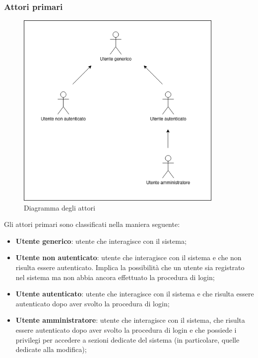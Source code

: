 \subsubsection{Attori primari}
	\begin{figure}[h!]
		\centering
		\includegraphics[width=10cm]{images/diagramma_attori.png}
		\caption{Diagramma degli attori}
	\end{figure}
	
	Gli attori primari sono classificati nella maniera seguente:
	\begin{itemize}
		\item \textbf{Utente generico}: utente che interagisce con il sistema;
		\item \textbf{Utente non autenticato}: utente che interagisce con il sistema e che non risulta essere autenticato. Implica la possibilità che un utente sia registrato nel sistema ma non abbia ancora effettuato la procedura di login;
		\item \textbf{Utente autenticato}: utente che interagisce con il sistema e che risulta essere autenticato dopo aver svolto la procedura di login;
		\item \textbf{Utente amministratore}: utente che interagisce con il sistema, che risulta essere autenticato dopo aver svolto la procedura di login e che possiede i privilegi per accedere a sezioni dedicate del sistema (in particolare, quelle dedicate alla modifica);
	\end{itemize}